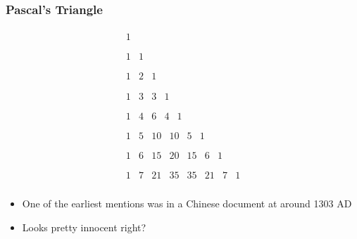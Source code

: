 \documentclass{beamer}
\begin{document}
\begin{frame}
    \frametitle{Pascal's Triangle}
    \begin{equation*}
        \begin{array}{c}
            \begin{array}{c}
             1 \\
            \end{array}
             \\
            \begin{array}{cc}
             1 & 1 \\
            \end{array}
             \\
            \begin{array}{ccc}
             1 & 2 & 1 \\
            \end{array}
             \\
            \begin{array}{cccc}
             1 & 3 & 3 & 1 \\
            \end{array}
             \\
            \begin{array}{ccccc}
             1 & 4 & 6 & 4 & 1 \\
            \end{array}
             \\
            \begin{array}{cccccc}
             1 & 5 & 10 & 10 & 5 & 1 \\
            \end{array}
             \\
            \begin{array}{ccccccc}
             1 & 6 & 15 & 20 & 15 & 6 & 1 \\
            \end{array}
             \\
            \begin{array}{cccccccc}
             1 & 7 & 21 & 35 & 35 & 21 & 7 & 1 \\
            \end{array}
        \end{array}
    \end{equation*}
    \begin{itemize}
        \item
        One of the earliest mentions was in a Chinese document at around 1303 AD
        \item
        Looks pretty innocent right?
    \end{itemize}

\end{frame}
\end{document}
